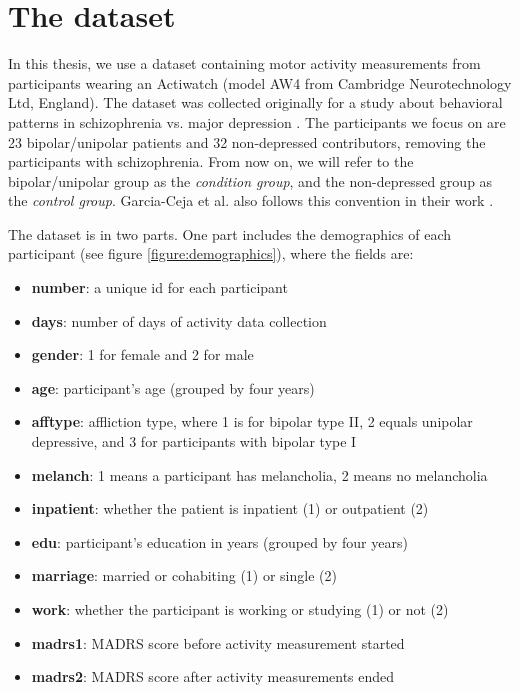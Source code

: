 \section{The dataset}

In this thesis, we use a dataset containing motor activity measurements from participants wearing an Actiwatch (model AW4 from Cambridge Neurotechnology Ltd, England). The dataset was collected originally for a study about behavioral patterns in schizophrenia vs. major depression \cite{Berle2010}. The participants we focus on are 23 bipolar/unipolar patients and 32 non-depressed contributors, removing the participants with schizophrenia. From now on, we will refer to the bipolar/unipolar group as the \textit{condition group}, and the non-depressed group as the \textit{control group}. Garcia-Ceja et al. also follows this convention in their work \cite{GarciaCeja2018_classification_bipolar}.

The dataset is in two parts. One part includes the demographics of each participant (see figure \ref{figure:demographics}), where the fields are:

\begin{itemize}
    \item \textbf{number}: a unique id for each participant
    \item \textbf{days}: number of days of activity data collection 
    \item \textbf{gender}: 1 for female and 2 for male
    \item \textbf{age}: participant's age (grouped by four years)
    \item \textbf{afftype}: affliction type, where 1 is for bipolar type II, 2 equals unipolar depressive, and 3 for participants with bipolar type I
    \item \textbf{melanch}: 1 means a participant has melancholia, 2 means no melancholia
    \item \textbf{inpatient}: whether the patient is inpatient (1) or outpatient (2)
    \item \textbf{edu}: participant's education in years (grouped by four years)
    \item \textbf{marriage}: married or cohabiting (1) or single (2)
    \item \textbf{work}: whether the participant is working or studying (1) or not (2)
    \item \textbf{madrs1}: MADRS score before activity measurement started
    \item \textbf{madrs2}: MADRS score after activity measurements ended
\end{itemize}

